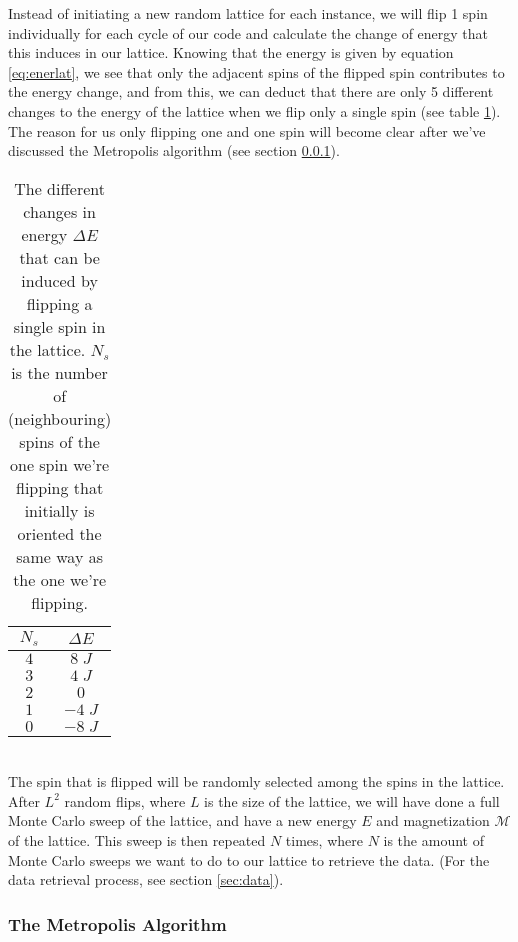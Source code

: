 \documentclass[reprint,english,notitlepage]{revtex4-1}  %
\begin{document}
Instead of initiating a new random lattice for each instance, we will flip 1 spin individually for each cycle of our code and calculate the change of energy that this induces in our lattice. Knowing that the energy is given by equation \ref{eq:enerlat}, we see that only the adjacent spins of the flipped spin contributes to the energy change, and from this, we can deduct that there are only 5 different changes to the energy of the lattice when we flip only a single spin (see table \ref{tab:enerswap}). The reason for us only flipping one and one spin will become clear after we've discussed the Metropolis algorithm (see section \ref{sec:metro}).
\begin{table}[h!]
    \centering
    \begin{tabular}{|c|c|}
         \hline
          $N_s$ & $\Delta E$ \\
         \hline\hline
         $4$&$8\;J$\\
         $3$&$4\;J$\\
         $2$&$0$\\
         $1$&$-4\;J$\\
         $0$&$-8\;J$\\
         \hline
    \end{tabular}
    \caption{The different changes in energy $\Delta E$ that can be induced by flipping a single spin in the lattice. $N_s$ is the number of (neighbouring) spins of the one spin we're flipping that initially is oriented the same way as the one we're flipping.}
    \label{tab:enerswap}
\end{table}
\\
The spin that is flipped will be randomly selected among the spins in the lattice. After $L^2$ random flips, where $L$ is the size of the lattice, we will have done a full Monte Carlo sweep of the lattice, and have a new energy $E$ and magnetization $\mathcal{M}$ of the lattice. This sweep is then repeated $N$ times, where $N$ is the amount of Monte Carlo sweeps we want to do to our lattice to retrieve the data. (For the data retrieval process, see section \ref{sec:data}).

\subsubsection{The Metropolis Algorithm}\label{sec:metro}
\end{document}
